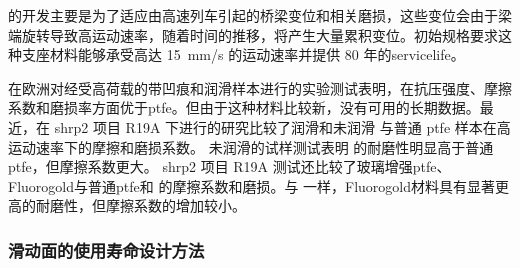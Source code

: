 \msm 的开发主要是为了适应由高速列车引起的桥梁变位和相关磨损，这些变位会由于梁端旋转导致高运动速率，随着时间的推移，将产生大量累积变位。初始规格要求这种支座材料能够承受高达 \qty{15}{mm/s} 的运动速率并提供 80 年的\gls*{servicelife}。

在欧洲对经受高荷载的带凹痕和润滑样本进行的实验测试表明，\msm 在抗压强度、摩擦系数和磨损率方面优于\acrlong*{ptfe}。但由于这种材料比较新，没有可用的长期数据。最近，在 \acrshort*{shrp}2 项目 R19A 下进行的研究比较了润滑和未润滑 \msm 与普通 \acrshort{ptfe} 样本在高运动速率下的摩擦和磨损系数。 未润滑的试样测试表明 \msm 的耐磨性明显高于普通\acrlong*{ptfe}，但摩擦系数更大。 \acrshort*{shrp}2 项目 R19A 测试还比较了玻璃增强\acrlong{ptfe}、Fluorogold\textsuperscript{\textregistered}与普通\acrlong*{ptfe}和 \msm 的摩擦系数和磨损。与 \msm 一样，Fluorogold\textsuperscript{\textregistered}材料具有显著更高的耐磨性，但摩擦系数的增加较小。

\subsubsection{滑动面的使用寿命设计方法}

